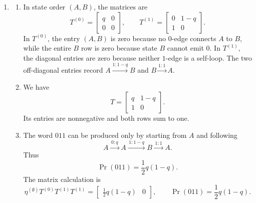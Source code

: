 \begin{solution}[ex:p3-1]
\begin{enumerate}
\begin{enumerate}
            No state permits a path labelled $000$: starting from $0$, the
            first $0$ moves to state $1$, which cannot emit $0$; starting from
            $1$, even the first $0$ is impossible; and starting from $R$, the
            first two zeros move through $R\to0\to1$, after which a third zero
            is impossible. Correspondingly,
            \[
              \eta^{(\emptyset)}T^{(0)}T^{(0)}T^{(0)}
                =\begin{bmatrix}0&0&0\end{bmatrix},
              \qquad
              \Pr(000)=0.
            \]
        \end{enumerate}

      \item
        \begin{enumerate}
          \item In state order $(A,B)$, the matrices are
            \[
              T^{(0)}=
              \begin{bmatrix}
                q&0\\
                0&0
              \end{bmatrix},
              \qquad
              T^{(1)}=
              \begin{bmatrix}
                0&1-q\\
                1&0
              \end{bmatrix}.
            \]
            In $T^{(0)}$, the entry $(A,B)$ is zero because no $0$-edge
            connects $A$ to $B$, while the entire $B$ row is zero because
            state $B$ cannot emit $0$. In $T^{(1)}$, the diagonal entries are
            zero because neither $1$-edge is a self-loop. The two off-diagonal
            entries record $A\xrightarrow{1:1-q}B$ and
            $B\xrightarrow{1:1}A$.

          \item We have
            \[
              T=
              \begin{bmatrix}
                q&1-q\\
                1&0
              \end{bmatrix}.
            \]
            Its entries are nonnegative and both rows sum to one.

          \item The word $011$ can be produced only by starting from $A$ and
            following
            \[
              A\xrightarrow{\,0:q\,}A
               \xrightarrow{\,1:1-q\,}B
               \xrightarrow{\,1:1\,}A.
            \]
            Thus
            \[
              \Pr(011)=\frac12q(1-q).
            \]
            The matrix calculation is
            \[
              \eta^{(\emptyset)}T^{(0)}T^{(1)}T^{(1)}
                =\begin{bmatrix}\tfrac12q(1-q)&0\end{bmatrix},
              \qquad
              \Pr(011)=\frac12q(1-q).
            \]


\end{enumerate}
\end{enumerate}
\end{solution}
